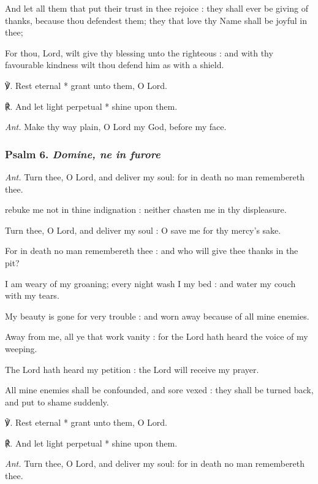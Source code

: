 And let all them that put their trust in thee rejoice : they shall ever be giving of thanks, because thou defendest them; they that love thy Name shall be joyful in thee;\par
{}For thou, Lord, wilt give thy blessing unto the righteous : and with thy favourable kindness wilt thou defend him as with a shield.\par
℣. Rest eternal * grant unto them, O Lord.\par
℟. And let light perpetual * shine upon them.\par\noindent
\textit{Ant.} Make thy way plain, O Lord my God, before my face.

\subsubsection{Psalm 6. \textit{Domine, ne in furore}}\par\noindent
\textit{Ant.} Turn thee, {\dag} O Lord, and deliver my soul: for in death no man remembereth thee.\par
{} rebuke me not in thine indignation : neither chasten me in thy displeasure.\par
{}
Turn thee, O Lord, and deliver my soul : O save me for thy mercy's sake.\par
{}For in death no man remembereth thee : and who will give thee thanks in the pit?\par
{}I am weary of my groaning; every night wash I my bed : and water my couch with my tears.\par
{}My beauty is gone for very trouble : and worn away because of all mine enemies.\par
{}Away from me, all ye that work vanity : for the Lord hath heard the voice of my weeping.\par
{}The Lord hath heard my petition : the Lord will receive my prayer.\par
{}All mine enemies shall be confounded, and sore vexed : they shall be turned back, and put to shame suddenly.\par
℣. Rest eternal * grant unto them, O Lord.\par
℟. And let light perpetual * shine upon them.\par\noindent
\textit{Ant.} Turn thee, O Lord, and deliver my soul: for in death no man remembereth thee.


